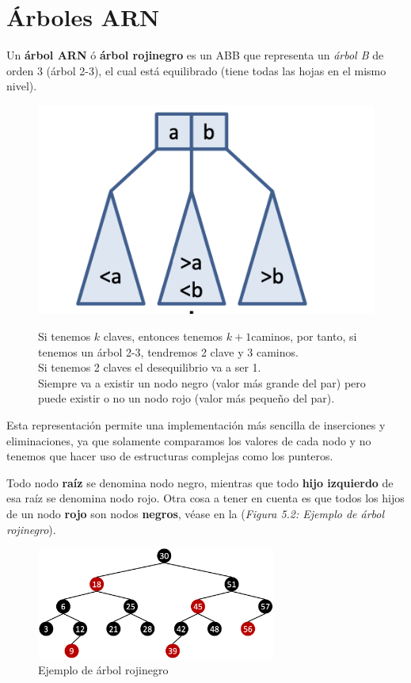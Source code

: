 \section{Árboles ARN}
Un \textbf{árbol ARN} ó \textbf{árbol rojinegro} es un ABB que representa un \textit{árbol B} de orden 3 (árbol 2-3), el cual está equilibrado (tiene todas las hojas en el mismo nivel).
\begin{figure}[h]
  \begin{minipage}{.4\textwidth}
    \includegraphics[width=\textwidth]{assets/arn1.png}
  \end{minipage}
  \hfill
  \begin{minipage}{.6\textwidth}
  Si tenemos \(k\) claves, entonces tenemos \(k+1\)caminos, por tanto, si tenemos un árbol 2-3, tendremos 2 clave y 3 caminos.\\
  Si tenemos 2 claves el desequilibrio va a ser 1.\\
  Siempre va a existir un nodo negro (valor más grande del par) pero puede existir o no un nodo rojo (valor más pequeño del par).
  \end{minipage}
\end{figure}

Esta representación permite una implementación más sencilla de inserciones y eliminaciones, ya que solamente comparamos los valores de cada nodo y no tenemos que hacer uso de estructuras complejas como los punteros.

Todo nodo \textbf{raíz} se denomina nodo negro, mientras que todo \textbf{hijo izquierdo} de esa raíz se denomina nodo rojo. Otra cosa a tener en cuenta es que todos los hijos de un nodo \textbf{rojo} son nodos \textbf{negros}, véase en la (\textit{Figura 5.2: Ejemplo de árbol rojinegro}).
\begin{figure}[h]
  \begin{center}
    \includegraphics[width=0.7\textwidth]{assets/arn2.png}
  \end{center}
  \caption{Ejemplo de árbol rojinegro}
\end{figure}

